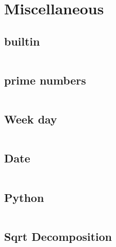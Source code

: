 \documentclass[a4paper, 10pt, twocolumn, landscape]{article}
\begin{document}
\section{Miscellaneous}
\subsection{builtin}
\inputminted{cpp}{misc/builtin.cpp}
\subsection{prime numbers}
\inputminted{text}{misc/prime-numbers.txt}
\subsection{Week day}
\inputminted{cpp}{misc/week-day.cpp}
\subsection{Date}
\inputminted{cpp}{misc/date.cpp}
\subsection{Python}
\inputminted{cpp}{misc/python.py}
\subsection{Sqrt Decomposition}
\inputminted{cpp}{misc/sqrt-decomposition.cpp}
\end{document}
